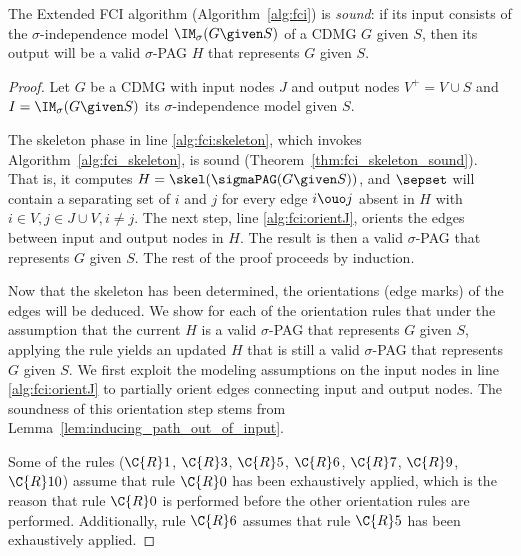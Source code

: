 \begin{Thm}\label{thm:fci_sound}
  The Extended FCI algorithm (Algorithm~\ref{alg:fci}) is \emph{sound}: if its input consists of the $\sigma$-independence model $\IM_\sigma(G \given S)$ of a CDMG $G$ given $S$, then its output will be a valid $\sigma$-PAG $H$ that represents $G$ given $S$.
\end{Thm}
\begin{proof}
  Let $G$ be a CDMG with input nodes $J$ and output nodes $V^+ = V \cup S$ and $I = \IM_\sigma(G \given S)$ its $\sigma$-independence model given $S$.

  The skeleton phase in line \ref{alg:fci:skeleton}, which invokes Algorithm~\ref{alg:fci_skeleton}, is sound (Theorem~\ref{thm:fci_skeleton_sound}).
  That is, it computes $H = \skel(\sigmaPAG(G \given S))$, and $\sepset$ will contain a separating set of $i$ and $j$ for every edge $i \ouo j$ absent in $H$ with $i \in V, j \in J \cup V, i \ne j$.
  The next step, line \ref{alg:fci:orientJ}, orients the edges between input and output nodes in $H$. 
  The result is then a valid $\sigma$-PAG that represents $G$ given $S$.
  The rest of the proof proceeds by induction.

  Now that the skeleton has been determined, the orientations (edge marks) of the edges will be deduced.
  We show for each of the orientation rules that under the assumption that the current $H$ is a valid $\sigma$-PAG that represents $G$ given $S$, applying the rule yields an updated $H$ that is still a valid $\sigma$-PAG that represents $G$ given $S$.
  We first exploit the modeling assumptions on the input nodes in line \ref{alg:fci:orientJ} to partially orient edges connecting input and output nodes.
  The soundness of this orientation step stems from Lemma~\ref{lem:inducing_path_out_of_input}.

  Some of the rules ($\C{R}1$, $\C{R}3$, $\C{R}5$, $\C{R}6$, $\C{R}7$, $\C{R}9$, $\C{R}10$) assume that rule $\C{R}0$ has been exhaustively applied, which is the reason that rule $\C{R}0$ is performed before the other orientation rules are performed.
  Additionally, rule $\C{R}6$ assumes that rule $\C{R}5$ has been exhaustively applied.


\end{proof}
